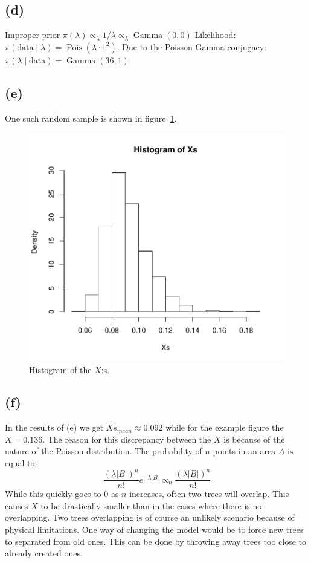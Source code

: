 \documentclass{article}
\DeclareMathOperator\Poisson{Pois}
\DeclareMathOperator\GammaDist{Gamma}
\begin{document}
\subsection{(d)}
Improper prior $\pi(\lambda) \propto_\lambda 1/\lambda \propto_\lambda \GammaDist(0, 0)$
Likelihood: $\pi(\text{data} \mid \lambda) = \Poisson(\lambda \cdot 1^2)$.
Due to the Poisson-Gamma conjugacy: $\pi(\lambda \mid \text{data}) = \GammaDist(36, 1)$

\subsection{(e)}
One such random sample is shown in figure~\ref{fig:X_histogram}.

\begin{figure}
    \centering
    \includegraphics[scale = 0.7]{Histo_Xs.pdf}
	\caption{Histogram of the $X$:s. \label{fig:X_histogram}}
\end{figure}

\subsection{(f)}
In the results of (e) we get $Xs_{mean} \approx 0.092$ while for the example figure the $X = 0.136$.
The reason for this discrepancy between the $X$ is because of the nature of the Poisson distribution.
The probability of $n$ points in an area $A$ is equal to:
$$\frac{(\lambda |B|)^n}{n!}e^{-\lambda|B|} \propto_n \frac{(\lambda |B|)^n}{n!}$$
While this quickly goes to $0$ as $n$ increases, often two trees will overlap.
This causes $X$ to be drastically smaller than in the cases where there is no overlapping.
Two trees overlapping is of course an unlikely scenario because of physical limitations.
One way of changing the model would be to force new trees to separated from old ones.
This can be done by throwing away trees too close to already created ones.
\end{document}
